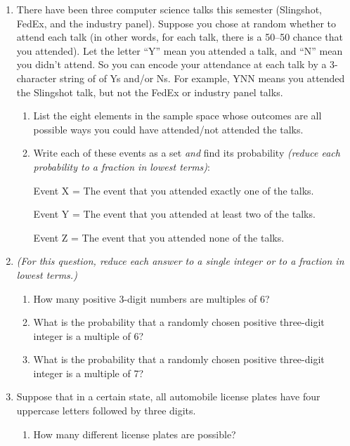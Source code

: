 \documentclass[11pt, letterpaper]{report}
\begin{document}
\begin{enumerate}



\item There have been three computer science talks this semester (Slingshot, FedEx, and the industry panel).  Suppose you 
chose at random whether to attend each talk (in other words, for each talk, there is a 50--50 chance that you attended).  Let the letter ``Y''
mean you attended a talk, and ``N'' mean you didn't attend.  So you can encode your attendance at each talk by a 3-character
string of of Ys and/or Ns.  For example, YNN means you attended the Slingshot talk, but not the FedEx or industry
panel talks.  

\begin{enumerate}
        \item List the eight elements in the sample space whose outcomes are all possible ways you could have attended/not 
        attended the talks. 
        
        \item Write each of these events as a set \emph{and}
find its probability \emph{(reduce each probability to a fraction in lowest terms)}: 
        
        Event X = The event that you attended exactly one of the talks. 
        
        Event Y = The event that you attended at least two of the talks.
        
        Event Z = The event that you attended none of the talks.
        
\end{enumerate}
        
\item \emph{(For this question, reduce each answer to a single integer or to a fraction in lowest terms.)}\begin{enumerate} 
 \item How many positive 3-digit numbers are multiples of 6? \item What is the probability that a randomly chosen positive
three-digit integer is a multiple of 6? \item What is the probability that a randomly chosen positive three-digit integer is a multiple of 7?
\end{enumerate}

\item Suppose that in a certain state, all automobile license plates have four uppercase letters followed by three digits.
\begin{enumerate}
        \item How many different license plates are possible?  
        

\end{enumerate}
\end{enumerate}
\end{document}
